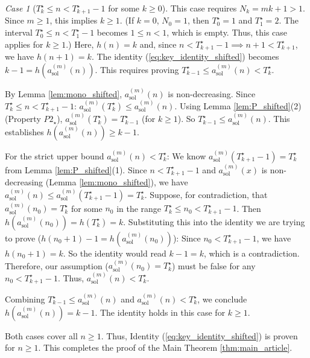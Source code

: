 \documentclass[11pt,a4paper]{article} %
\theoremstyle{remark}
\newtheorem{caseenv}{Case}[section] %
\begin{document}
\begin{caseenv}[$T^{\star}_k \le n < T^{\star}_{k+1}-1$ for some $k \ge 0$] \label{case:key_identity_internal}
This case requires $N_k=mk+1 > 1$. Since $m \ge 1$, this implies $k \ge 1$. (If $k=0$, $N_0=1$, then $T^{\star}_0=1$ and $T^{\star}_1=2$. The interval $T^{\star}_0 \le n < T^{\star}_1-1$ becomes $1 \le n < 1$, which is empty. Thus, this case applies for $k \ge 1$.)
Here, $h(n)=k$ and, since $n < T^{\star}_{k+1}-1 \implies n+1 < T^{\star}_{k+1}$, we have $h(n+1)=k$.
The identity (\ref{eq:key_identity_shifted}) becomes $k-1 = h(a_{\text{sol}}^{(m)}(n))$.
This requires proving $T^{\star}_{k-1} \le a_{\text{sol}}^{(m)}(n) < T^{\star}_k$.

By Lemma \ref{lem:mono_shifted}, $a_{\text{sol}}^{(m)}(n)$ is non-decreasing.
Since $T^{\star}_k \le n < T^{\star}_{k+1}-1$:
$a_{\text{sol}}^{(m)}(T^{\star}_k) \le a_{\text{sol}}^{(m)}(n)$.
Using Lemma \ref{lem:P_shifted}(2) (Property $P2_{\star}$), $a_{\text{sol}}^{(m)}(T^{\star}_k)=T^{\star}_{k-1}$ (for $k \ge 1$).
So $T^{\star}_{k-1} \le a_{\text{sol}}^{(m)}(n)$. This establishes $h(a_{\text{sol}}^{(m)}(n)) \ge k-1$.

For the strict upper bound $a_{\text{sol}}^{(m)}(n) < T^{\star}_k$:
We know $a_{\text{sol}}^{(m)}(T^{\star}_{k+1}-1) = T^{\star}_k$ from Lemma \ref{lem:P_shifted}(1).
Since $n < T^{\star}_{k+1}-1$ and $a_{\text{sol}}^{(m)}(x)$ is non-decreasing (Lemma \ref{lem:mono_shifted}), we have $a_{\text{sol}}^{(m)}(n) \le a_{\text{sol}}^{(m)}(T^{\star}_{k+1}-1) = T^{\star}_k$.
Suppose, for contradiction, that $a_{\text{sol}}^{(m)}(n_0) = T^{\star}_k$ for some $n_0$ in the range $T^{\star}_k \le n_0 < T^{\star}_{k+1}-1$.
Then $h(a_{\text{sol}}^{(m)}(n_0)) = h(T^{\star}_k) = k$.
Substituting this into the identity we are trying to prove ($h(n_0+1)-1 = h(a_{\text{sol}}^{(m)}(n_0))$):
Since $n_0 < T^{\star}_{k+1}-1$, we have $h(n_0+1)=k$.
So the identity would read $k-1 = k$, which is a contradiction.
Therefore, our assumption ($a_{\text{sol}}^{(m)}(n_0) = T^{\star}_k$) must be false for any $n_0 < T^{\star}_{k+1}-1$.
Thus, $a_{\text{sol}}^{(m)}(n) < T^{\star}_k$.

Combining $T^{\star}_{k-1} \le a_{\text{sol}}^{(m)}(n)$ and $a_{\text{sol}}^{(m)}(n) < T^{\star}_k$, we conclude $h(a_{\text{sol}}^{(m)}(n))=k-1$.
The identity holds in this case for $k \ge 1$.
\end{caseenv}

Both cases cover all $n \ge 1$. Thus, Identity (\ref{eq:key_identity_shifted}) is proven for $n \ge 1$.
This completes the proof of the Main Theorem \ref{thm:main_article}.
\end{document}
